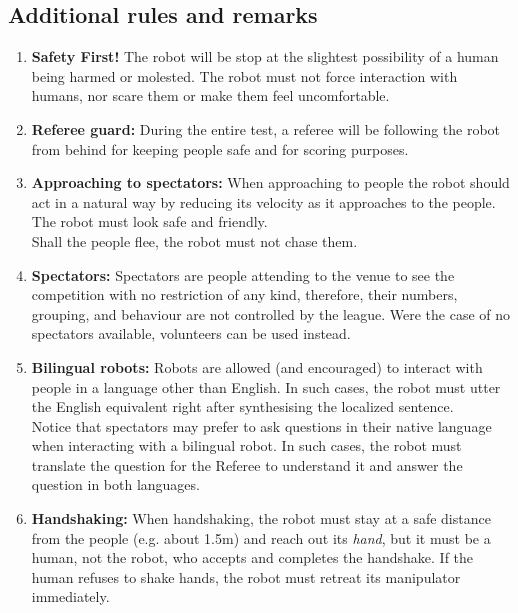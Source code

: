 \subsection{Additional rules and remarks}
\begin{enumerate}
	\item \textbf{Safety First!} The robot will be stop at the slightest possibility of a human being harmed or molested. The robot must not force interaction with humans, nor scare them or make them feel uncomfortable. \\

	\item \textbf{Referee guard:} During the entire test, a referee will be following the robot from behind for keeping people safe and for scoring purposes.\\
	
	\item \textbf{Approaching to spectators:} When approaching to people the robot should act in a natural way by reducing its velocity as it approaches to the people. The robot must look safe and friendly.\\

	Shall the people flee, the robot must not chase them.\\

	\item \textbf{Spectators:} Spectators are people attending to the venue to see the competition with no restriction of any kind, therefore, their numbers, grouping, and behaviour are not controlled by the league. Were the case of no spectators available, volunteers can be used instead.\\

	\item \textbf{Bilingual robots:} Robots are allowed (and encouraged) to interact with people in a language other than English. In such cases, the robot must utter the English equivalent right after synthesising the localized sentence. \\

	Notice that spectators may prefer to ask questions in their native language when interacting with a bilingual robot. In such cases, the robot must translate the question for the Referee to understand it and answer the question in both languages.\\

	\item \textbf{Handshaking:} When handshaking, the robot must stay at a safe distance from the people (e.g. about 1.5m) and reach out its \textit{hand}, but it must be a human, not the robot, who accepts and completes the handshake. If the human refuses to shake hands, the robot must retreat its manipulator immediately.\\


\end{enumerate}
